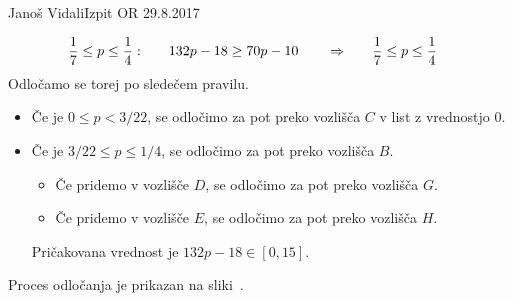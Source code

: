 \begin{naloga}{Janoš Vidali}{Izpit OR 29.8.2017}
\begin{odgovor}
\begin{alignat*}{4}
{1 \over 7} &\le p \le {1 \over 4}: &\quad 132p - 18 &\ge 70p - 10
&\quad&\Rightarrow\quad & {1 \over 7} &\le p \le {1 \over 4}
\end{alignat*}
Odločamo se torej po sledečem pravilu.
\begin{itemize}
\item Če je $0 \le p < 3/22$,
se odločimo za pot preko vozlišča $C$ v list z vrednostjo $0$.
\item Če je $3/22 \le p \le 1/4$,
se odločimo za pot preko vozlišča $B$.
    \begin{itemize}
    \item Če pridemo v vozlišče $D$, se odločimo za pot preko vozlišča $G$.
    \item Če pridemo v vozlišče $E$, se odločimo za pot preko vozlišča $H$.
    \end{itemize}
Pričakovana vrednost je $132p - 18 \in [0, 15]$.
\end{itemize}
Proces odločanja je prikazan na sliki~.

\begin{slika}
\end{slika}
\end{odgovor}
\end{naloga}
